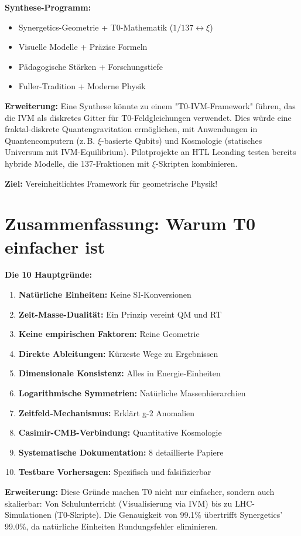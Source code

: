 \documentclass[12pt,a4paper]{article}
\newcommand{\xipar}{\xi}
\begin{document}
	\begin{gemeinsam}
		\textbf{Synthese-Programm:}
		
		\begin{itemize}
			\item Synergetics-Geometrie + T0-Mathematik ($1/137 \leftrightarrow \xipar$)
			\item Visuelle Modelle + Präzise Formeln
			\item Pädagogische Stärken + Forschungstiefe
			\item Fuller-Tradition + Moderne Physik
		\end{itemize}
		
		\textbf{Erweiterung:} Eine Synthese könnte zu einem "T0-IVM-Framework" führen, das die IVM als diskretes Gitter für T0-Feldgleichungen verwendet. Dies würde eine fraktal-diskrete Quantengravitation ermöglichen, mit Anwendungen in Quantencomputern (z.\,B. $\xipar$-basierte Qubits) und Kosmologie (statisches Universum mit IVM-Equilibrium). Pilotprojekte an HTL Leonding testen bereits hybride Modelle, die 137-Fraktionen mit $\xipar$-Skripten kombinieren.
		
		\textbf{Ziel:} Vereinheitlichtes Framework für geometrische Physik!
	\end{gemeinsam}
	
	\section{Zusammenfassung: Warum T0 einfacher ist}
	
	\begin{vorteil}
		\textbf{Die 10 Hauptgründe:}
		
		\begin{enumerate}
			\item \textbf{Natürliche Einheiten:} Keine SI-Konversionen
			\item \textbf{Zeit-Masse-Dualität:} Ein Prinzip vereint QM und RT
			\item \textbf{Keine empirischen Faktoren:} Reine Geometrie
			\item \textbf{Direkte Ableitungen:} Kürzeste Wege zu Ergebnissen
			\item \textbf{Dimensionale Konsistenz:} Alles in Energie-Einheiten
			\item \textbf{Logarithmische Symmetrien:} Natürliche Massenhierarchien
			\item \textbf{Zeitfeld-Mechanismus:} Erklärt g-2 Anomalien
			\item \textbf{Casimir-CMB-Verbindung:} Quantitative Kosmologie
			\item \textbf{Systematische Dokumentation:} 8 detaillierte Papiere
			\item \textbf{Testbare Vorhersagen:} Spezifisch und falsifizierbar
		\end{enumerate}
		
		\textbf{Erweiterung:} Diese Gründe machen T0 nicht nur einfacher, sondern auch skalierbar: Von Schulunterricht (Visualisierung via IVM) bis zu LHC-Simulationen (T0-Skripte). Die Genauigkeit von 99.1\% übertrifft Synergetics' 99.0\%, da natürliche Einheiten Rundungsfehler eliminieren.
	\end{vorteil}
	
\end{document}
